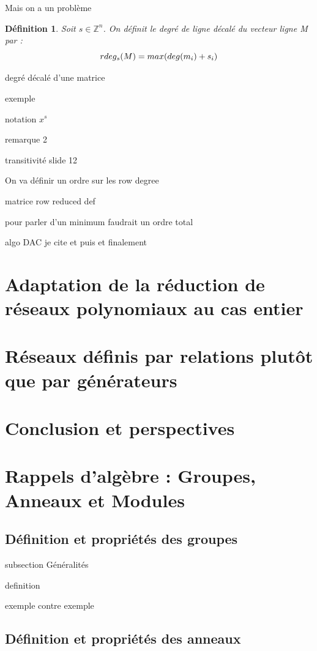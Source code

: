 \documentclass[a4paper,12pt]{report}  %
\theoremstyle{definitionstyle}
\newtheorem{definition}{Définition}[chapter] %
\theoremstyle{examplestyle}
\theoremstyle{remarkstyle}
\theoremstyle{propositionstyle}
\theoremstyle{theoremstyle}
\begin{document}
	Mais on a un problème
	
	\begin{definition}
		Soit $s \in \mathbb{Z}^n$. On définit le degré de ligne décalé du vecteur ligne M par :
		$$rdeg_s(M)=max(deg(m_i)+s_i\\)$$
	\end{definition}
	degré décalé d'une matrice
	
	exemple
	
	notation $x^s$
	
	remarque 2
	
	transitivité slide 12
	
	On va définir un ordre sur les row degree
	
	
	
	matrice row reduced def
	
	
	pour parler d'un minimum faudrait un ordre total
	
	algo DAC
	 je cite \cite{clef_unique_2} et puis \cite{clef_unique_3} et finalement \cite{clef_unique_4}
	
	\chapter{Adaptation de la réduction de réseaux polynomiaux au cas entier}
	
	\chapter{Réseaux définis par relations plutôt que par générateurs}
	\chapter*{Conclusion et perspectives}
	
	\appendix
	\chapter{Rappels d'algèbre : Groupes, Anneaux et Modules}

	\section{Définition et propriétés des groupes}
	
	
	subsection Généralités
	
	definition
	
	exemple contre exemple
	
	
	\section{Définition et propriétés des anneaux}
	
\end{document}
